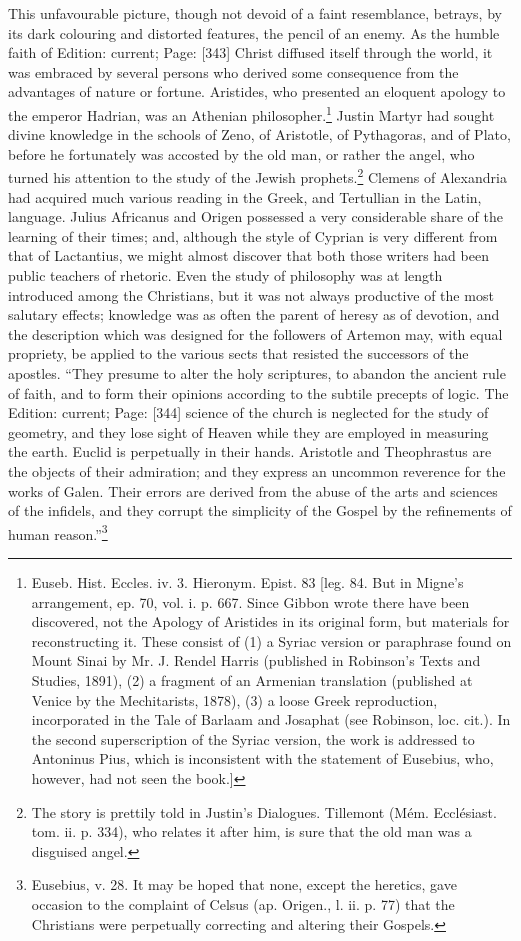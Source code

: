 This unfavourable picture, though not devoid of a faint resemblance, betrays, by its dark colouring and distorted features, the pencil of an enemy. As the humble faith of Edition: current; Page: [343] Christ diffused itself through the world, it was embraced by several persons who derived some consequence from the advantages of nature or fortune. Aristides, who presented an eloquent apology to the emperor Hadrian, was an Athenian philosopher.\footnote{Euseb. Hist. Eccles. iv. 3. Hieronym. Epist. 83 [leg. 84. But in Migne\texthebrew{}’s arrangement, ep. 70, vol. i. p. 667. Since Gibbon wrote there have been discovered, not the Apology of Aristides in its original form, but materials for reconstructing it. These consist of (1) a Syriac version or paraphrase found on Mount Sinai by Mr. J. Rendel Harris (published in Robinson\texthebrew{}’s Texts and Studies, 1891), (2) a fragment of an Armenian translation (published at Venice by the Mechitarists, 1878), (3) a loose Greek reproduction, incorporated in the Tale of Barlaam and Josaphat (see Robinson, loc. cit.). In the second superscription of the Syriac version, the work is addressed to Antoninus Pius, which is inconsistent with the statement of Eusebius, who, however, had not seen the book.]} Justin Martyr had sought divine knowledge in the schools of Zeno, of Aristotle, of Pythagoras, and of Plato, before he fortunately was accosted by the old man, or rather the angel, who turned his attention to the study of the Jewish prophets.\footnote{The story is prettily told in Justin\texthebrew{}’s Dialogues. Tillemont (Mém. Ecclésiast. tom. ii. p. 334), who relates it after him, is sure that the old man was a disguised angel.} Clemens of Alexandria had acquired much various reading in the Greek, and Tertullian in the Latin, language. Julius Africanus and Origen possessed a very considerable share of the learning of their times; and, although the style of Cyprian is very different from that of Lactantius, we might almost discover that both those writers had been public teachers of rhetoric. Even the study of philosophy was at length introduced among the Christians, but it was not always productive of the most salutary effects; knowledge was as often the parent of heresy as of devotion, and the description which was designed for the followers of Artemon may, with equal propriety, be applied to the various sects that resisted the successors of the apostles. \texthebrew{“}They presume to alter the holy scriptures, to abandon the ancient rule of faith, and to form their opinions according to the subtile precepts of logic. The Edition: current; Page: [344] science of the church is neglected for the study of geometry, and they lose sight of Heaven while they are employed in measuring the earth. Euclid is perpetually in their hands. Aristotle and Theophrastus are the objects of their admiration; and they express an uncommon reverence for the works of Galen. Their errors are derived from the abuse of the arts and sciences of the infidels, and they corrupt the simplicity of the Gospel by the refinements of human reason.\texthebrew{}”\footnote{Eusebius, v. 28. It may be hoped that none, except the heretics, gave occasion to the complaint of Celsus (ap. Origen., l. ii. p. 77) that the Christians were perpetually correcting and altering their Gospels.}

